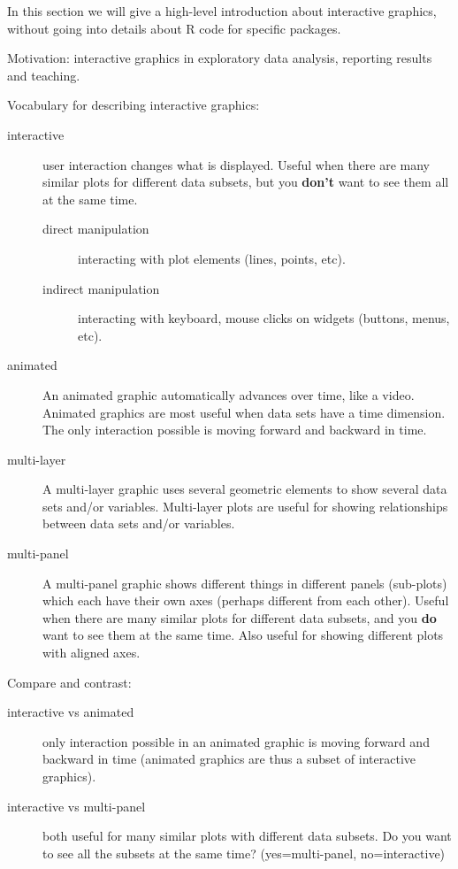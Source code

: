 \documentclass[11pt]{article}
\begin{document}
In this section we will give a high-level introduction about
interactive graphics, without going into details about R code for
specific packages.

Motivation: interactive graphics in exploratory data analysis,
reporting results and teaching.

Vocabulary for describing interactive graphics:
\begin{description}
\item[{interactive}] user interaction changes what is displayed. Useful
when there are many similar plots for different data subsets, but
you \textbf{don't} want to see them all at the same time.
\begin{description}
\item[{direct manipulation}] interacting with plot elements (lines,
points, etc).
\item[{indirect manipulation}] interacting with keyboard, mouse clicks
on widgets (buttons, menus, etc).
\end{description}
\item[{animated}] An animated graphic automatically advances over time,
like a video. Animated graphics are most useful when data sets
have a time dimension. The only interaction possible is moving
forward and backward in time.
\item[{multi-layer}] A multi-layer graphic uses several geometric elements
to show several data sets and/or variables. Multi-layer plots are
useful for showing relationships between data sets and/or
variables.
\item[{multi-panel}] A multi-panel graphic shows different things in
different panels (sub-plots) which each have their own axes
(perhaps different from each other). Useful when there are many
similar plots for different data subsets, and you \textbf{do} want to
see them at the same time. Also useful for showing different
plots with aligned axes.
\end{description}
Compare and contrast:
\begin{description}
\item[{interactive vs animated}] only interaction possible in an animated
graphic is moving forward and backward in time (animated graphics
are thus a subset of interactive graphics).
\item[{interactive vs multi-panel}] both useful for many similar plots
with different data subsets. Do you want to see all the subsets
at the same time? (yes=multi-panel, no=interactive)
\end{description}
\end{document}
